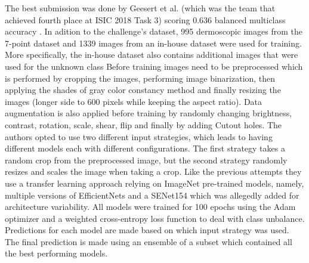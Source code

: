 The best submission was done by Geesert et al. (which was the team that achieved fourth place at ISIC 2018 Task 3) scoring 0.636 balanced multiclass accuracy \cite{isic2019first}. 
In adition to the challenge's dataset, 995 dermoscopic images from the 7-point dataset \cite{?} and 1339 images from an in-house dataset were used for training. More specifically, the in-house dataset also contains additional images that were used for the unknown class  
Before training images need to be preprocessed which is performed by cropping the images, performing image binarization, then applying the shades of gray color constancy method \cite{shadesgray} and finally resizing the images (longer side to 600 pixels while keeping the aspect ratio). 
Data augmentation is also applied before training by randomly changing brightness, contrast, rotation, scale, shear, flip and finally by adding  Cutout \cite{cutout} holes.  
The authors opted to use two different input strategies, which leads to having different models each with different configurations. The first strategy takes a random crop from the preprocessed image, but the second strategy randomly resizes and scales the image when taking a crop. 
Like the previous attempts they use a transfer learning approach relying on ImageNet pre-trained models, namely, multiple versions of EfficientNets and a SENet154 which was allegedly added for architecture variability. All models were trained for 100 epochs using the Adam optimizer \cite{adam} and a weighted cross-entropy loss function to deal with class unbalance.
Predictions for each model are made based on which input strategy was used. The final prediction is made using an ensemble of a subset which contained all the best performing models. \par

